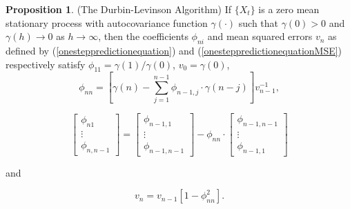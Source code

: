 \documentclass[11pt, a4paper]{article}
\numberwithin{equation}{section}
\theoremstyle{definition}
\newtheorem{proposition}{Proposition}[section]
\begin{document}
\begin{proposition}
(The Durbin-Levinson Algorithm) If $\{X_t\}$ is a zero mean stationary process with autocovariance function $\gamma(\cdot)$ such that $\gamma(0) > 0$ and $\gamma(h) \rightarrow 0$ as $h \rightarrow \infty$, then the coefficients $\phi_{ni}$ and mean squared errors $v_n$ as defined by (\ref{onesteppredictionequation}) and (\ref{onesteppredictionequationMSE}) respectively satisfy $\phi_{11} = \gamma(1) / \gamma(0)$, $v_0 = \gamma(0)$,
\begin{equation}\label{DLphinnupdate}
\phi_{nn} = \left[ \gamma(n) - \sum \limits_{j = 1}^{n-1} \phi_{n-1, j} \cdot \gamma(n-j) \right] v_{n-1}^{-1},
\end{equation}

\begin{equation}\label{DLphivectorupdate}
\begin{bmatrix}
\phi_{n1} \\ \vdots \\ \phi_{n, n-1} 
\end{bmatrix}
= 
\begin{bmatrix}
\phi_{n-1, 1} \\ \vdots \\ \phi_{n-1, n-1} 
\end{bmatrix}
- \phi_{nn} \cdot
\begin{bmatrix}
\phi_{n-1, n-1} \\ \vdots \\ \phi_{n-1, 1} 
\end{bmatrix}
\end{equation}

and

\begin{equation}\label{DLMSEupdate}
v_n = v_{n-1} \left[ 1 - \phi_{nn}^2 \right].
\end{equation}
\end{proposition}
\end{document}
